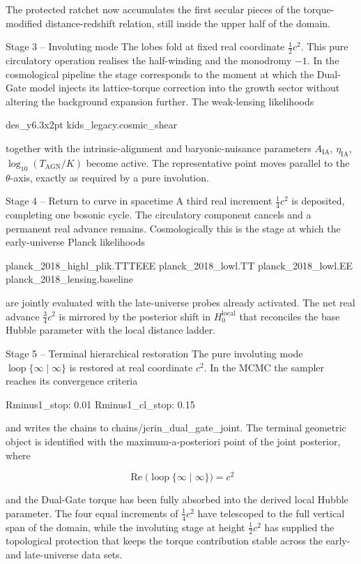 The protected ratchet now accumulates the first secular pieces of the torque-modified distance-redshift relation, still inside the upper half of the domain.

Stage 3 – Involuting mode
The lobes fold at fixed real coordinate \(\frac12 c^2\).  
This pure circulatory operation realises the half-winding and the monodromy \(-1\). In the cosmological pipeline the stage corresponds to the moment at which the Dual-Gate model injects its lattice-torque correction into the growth sector without altering the background expansion further. The weak-lensing likelihoods

des_y6.3x2pt
kids_legacy.cosmic_shear

together with the intrinsic-alignment and baryonic-nuisance parameters \(A_\mathrm{IA}\), \(\eta_\mathrm{IA}\), \(\log_{10}(T_\mathrm{AGN}/K)\) become active. The representative point moves parallel to the \(\theta\)-axis, exactly as required by a pure involution.

Stage 4 – Return to curve in spacetime
A third real increment \(\frac14 c^2\) is deposited, completing one bosonic cycle.  
The circulatory component cancels and a permanent real advance remains. Cosmologically this is the stage at which the early-universe Planck likelihoods

planck_2018_highl_plik.TTTEEE
planck_2018_lowl.TT
planck_2018_lowl.EE
planck_2018_lensing.baseline

are jointly evaluated with the late-universe probes already activated. The net real advance \(\frac34 c^2\) is mirrored by the posterior shift in \(H_0^\mathrm{local}\) that reconciles the base Hubble parameter with the local distance ladder.

Stage 5 – Terminal hierarchical restoration
The pure involuting mode \(\operatorname{loop}\{\infty\mid\infty\}\) is restored at real coordinate \(c^2\).  
In the MCMC the sampler reaches its convergence criteria

Rminus1_stop: 0.01
Rminus1_cl_stop: 0.15

and writes the chains to chains/jcrin_dual_gate_joint. The terminal geometric object is identified with the maximum-a-posteriori point of the joint posterior, where

\[
\operatorname{Re}\bigl(\operatorname{loop}\{\infty\mid\infty\}\bigr)=c^2
\]

and the Dual-Gate torque has been fully absorbed into the derived local Hubble parameter. The four equal increments of \(\frac14 c^2\) have telescoped to the full vertical span of the domain, while the involuting stage at height \(\frac12 c^2\) has supplied the topological protection that keeps the torque contribution stable across the early- and late-universe data sets.

